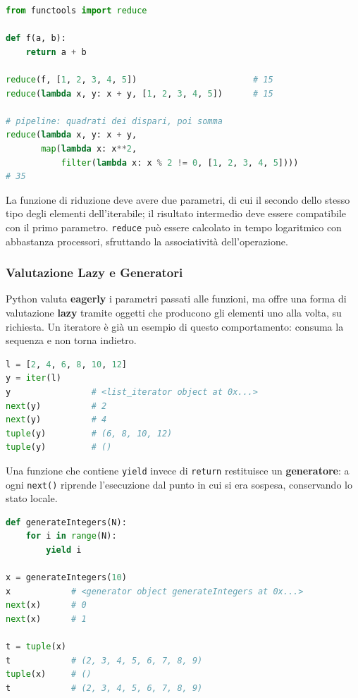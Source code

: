 \documentclass[12pt]{extarticle}
\begin{document}
\begin{lstlisting}[language=Python]
from functools import reduce

def f(a, b):
    return a + b

reduce(f, [1, 2, 3, 4, 5])                       # 15
reduce(lambda x, y: x + y, [1, 2, 3, 4, 5])      # 15

# pipeline: quadrati dei dispari, poi somma
reduce(lambda x, y: x + y,
       map(lambda x: x**2,
           filter(lambda x: x % 2 != 0, [1, 2, 3, 4, 5])))
# 35
\end{lstlisting}

\noindent La funzione di riduzione deve avere due parametri, di cui il secondo dello stesso tipo degli elementi dell'iterabile; il risultato intermedio deve essere compatibile con il primo parametro. \texttt{reduce} può essere calcolato in tempo logaritmico con abbastanza processori, sfruttando la associatività dell'operazione.

\subsubsection{Valutazione Lazy e Generatori}

\noindent Python valuta \textbf{eagerly} i parametri passati alle funzioni, ma offre una forma di valutazione \textbf{lazy} tramite oggetti che producono gli elementi uno alla volta, su richiesta. Un iteratore è già un esempio di questo comportamento: consuma la sequenza e non torna indietro.

\begin{lstlisting}[language=Python]
l = [2, 4, 6, 8, 10, 12]
y = iter(l)
y                # <list_iterator object at 0x...>
next(y)          # 2
next(y)          # 4
tuple(y)         # (6, 8, 10, 12)
tuple(y)         # ()
\end{lstlisting}

\noindent Una funzione che contiene \texttt{yield} invece di \texttt{return} restituisce un \textbf{generatore}: a ogni \texttt{next()} riprende l'esecuzione dal punto in cui si era sospesa, conservando lo stato locale.

\begin{lstlisting}[language=Python]
def generateIntegers(N):
    for i in range(N):
        yield i

x = generateIntegers(10)
x            # <generator object generateIntegers at 0x...>
next(x)      # 0
next(x)      # 1

t = tuple(x)
t            # (2, 3, 4, 5, 6, 7, 8, 9)
tuple(x)     # ()
t            # (2, 3, 4, 5, 6, 7, 8, 9)
\end{lstlisting}
\end{document}
